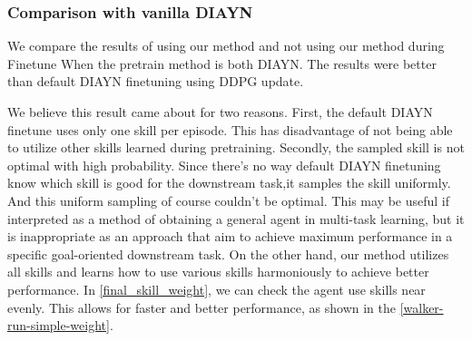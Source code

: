 \subsubsection{Comparison with vanilla DIAYN}
We compare the results of using our method and not using our method during Finetune When the pretrain method is both DIAYN.
The results were better than default DIAYN finetuning using DDPG update.

We believe this result came about for two reasons.
First, the default DIAYN finetune uses only one skill per episode.
This has disadvantage of not being able to utilize other skills learned during pretraining.
Secondly, the sampled skill is not optimal with high probability.
Since there's no way default DIAYN finetuning know which skill is good for the downstream task,it samples the skill uniformly.
And this uniform sampling of course couldn't be optimal.
This may be useful if interpreted as a method of obtaining a general agent in multi-task learning,
but it is inappropriate as an approach that aim to achieve maximum performance in a specific goal-oriented downstream task.
On the other hand, our method utilizes all skills and learns how to use various skills harmoniously to achieve better performance.
In \cref*{final_skill_weight}, we can check the agent use skills near evenly.
This allows for faster and better performance, as shown in the \cref{walker-run-simple-weight}.



